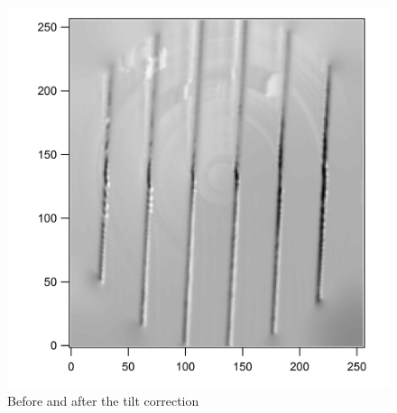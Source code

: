 \begin{figure}[ht]
\begin{minipage}[b]{0.45\linewidth}
\end{minipage}
\hspace{0.5cm}
\begin{minipage}[b]{0.45\linewidth}
\centering
\includegraphics[width=\textwidth]{images/TiltSession0226wc_35.png}
\end{minipage}
\caption{Before and after the tilt correction}
\label{fig:tiltimages}
\end{figure}

